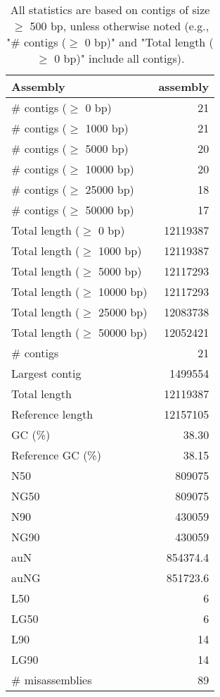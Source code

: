\documentclass[12pt,a4paper]{article}
\begin{document}
\begin{table}[ht]
\begin{center}
\caption{All statistics are based on contigs of size $\geq$ 500 bp, unless otherwise noted (e.g., "\# contigs ($\geq$ 0 bp)" and "Total length ($\geq$ 0 bp)" include all contigs).}
\begin{tabular}{|l*{1}{|r}|}
\hline
Assembly & assembly \\ \hline
\# contigs ($\geq$ 0 bp) & 21 \\ \hline
\# contigs ($\geq$ 1000 bp) & 21 \\ \hline
\# contigs ($\geq$ 5000 bp) & 20 \\ \hline
\# contigs ($\geq$ 10000 bp) & 20 \\ \hline
\# contigs ($\geq$ 25000 bp) & 18 \\ \hline
\# contigs ($\geq$ 50000 bp) & 17 \\ \hline
Total length ($\geq$ 0 bp) & 12119387 \\ \hline
Total length ($\geq$ 1000 bp) & 12119387 \\ \hline
Total length ($\geq$ 5000 bp) & 12117293 \\ \hline
Total length ($\geq$ 10000 bp) & 12117293 \\ \hline
Total length ($\geq$ 25000 bp) & 12083738 \\ \hline
Total length ($\geq$ 50000 bp) & 12052421 \\ \hline
\# contigs & 21 \\ \hline
Largest contig & 1499554 \\ \hline
Total length & 12119387 \\ \hline
Reference length & 12157105 \\ \hline
GC (\%) & 38.30 \\ \hline
Reference GC (\%) & 38.15 \\ \hline
N50 & 809075 \\ \hline
NG50 & 809075 \\ \hline
N90 & 430059 \\ \hline
NG90 & 430059 \\ \hline
auN & 854374.4 \\ \hline
auNG & 851723.6 \\ \hline
L50 & 6 \\ \hline
LG50 & 6 \\ \hline
L90 & 14 \\ \hline
LG90 & 14 \\ \hline
\# misassemblies & 89 \\ \hline

\end{tabular}
\end{center}
\end{table}
\end{document}

